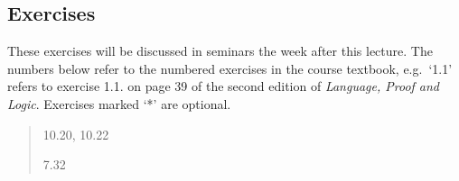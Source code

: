 \documentclass[12pt]{extarticle}
\begin{document}
\begin{multicols*}{3}
\vfill
\begin{minipage}{\columnwidth}
\section{Exercises}
These exercises will be discussed in seminars the week after this lecture.
The numbers below refer to the numbered exercises in the course textbook, e.g.\ `1.1' refers to exercise 1.1. on page 39 of the second edition of \emph{Language, Proof and Logic}. Exercises marked `*' are optional.
 
\begin{quote}
10.20, 10.22
 
7.32
 
\end{quote}
\end{minipage}

 


\end{multicols*}
\end{document}
